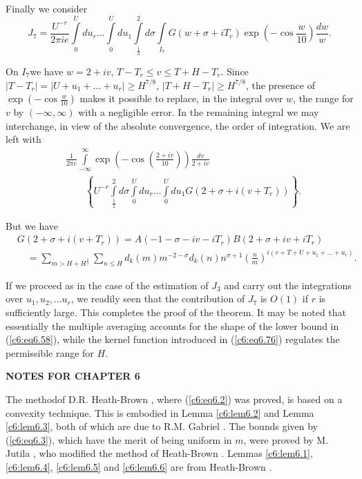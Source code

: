 Finally we consider
$$ 
J_7 = \frac{U^{-r}}{2 \pi i e} \int\limits^U_0 du_r \ldots
\int\limits^U_0 du_1 \int\limits^2_{\frac{1}{2}} d
\sigma\int\limits_{I_7} G(w+ \sigma + i T_r) \exp \left(-\cos
\frac{w}{10} \right) \frac{dw}{w}. 
$$

On $I_7$\pageoriginale we have $w = 2 + iv$, $T - T_r \leq v \leq T +
H - T_r$. Since $|T - T_r| = |U + u_1 + \ldots + u_r| \geq H^{7/8}$,
$|T+ H - T_r| \geq H^{7/8}$, the presence of $\exp\left(-\cos
\frac{w}{10} \right)$ makes it possible to replace, in the integral
over $w$, the range for $v$ by $(-\infty, \infty)$ with a negligible
error. In the remaining integral we may interchange, in view of the
absolute convergence, the order of integration. We are left with  
\begin{align*}
& \frac{1}{2\pi e} \int\limits^{\infty}_{-\infty} \exp \left(-\cos
  \left(\frac{2+iv}{10} \right) \right) \frac{dv}{2+iv}\\ 
& \qquad \left\{ U^{-r} \int\limits^2_{\frac{1}{2}} d \sigma
  \int\limits^U_0 du_r \ldots \int\limits^U_0 du_1 G \left(2+ \sigma +
  i (v+ T_r)\right)\right\}. 
\end{align*}

But we have
\begin{align*}
& G(2 + \sigma + i (v+ T_r)) = A(-1-\sigma - iv - iT_r) B (2+ \sigma +
  iv + iT_r)\\ 
&\quad = \sum\limits_{m> H + H^{\frac{1}{4}}} \sum\limits_{n \leq H}
  d_k(m) m^{-2 - \sigma} d_k(n) n^{\sigma +1} \left(\frac{n}{m}
  \right)^{i(v+T+ U+ u_1 + \ldots + u_r)}. 
\end{align*}

If we proceed as in the case of the estimation of $J_3$ and carry out
the integrations over $u_1,u_2, \ldots u_r$, we readily seen that the
contribution of $J_7$ is $O(1)$ if $r$ is sufficiently large. This
completes the proof of the theorem. It may be noted that essentially
the multiple averaging accounts for the shape of the lower bound in
(\ref{c6:eq6.58}), while the kernel function introduced in
(\ref{c6:eq6.76}) regulates the permissible range for $H$. 

\newpage

\begin{center}
\textbf{NOTES FOR CHAPTER 6}
\end{center}

The method\pageoriginale of D.R. Heath-Brown \cite{Heath-Brown4},
where (\ref{c6:eq6.2}) was proved, is based on a convexity
technique. This is embodied in Lemma \ref{c6:lem6.2} and Lemma
\ref{c6:lem6.3}, both of which are due to R.M. Gabriel
\cite{Gabriel1}. The bounds given by (\ref{c6:eq6.3}), which have the
merit of being uniform in $m$, were proved by M. Jutila
\cite{Jutila2}, who modified the method of Heath-Brown
\cite{Heath-Brown4}. Lemmas \ref{c6:lem6.1}, \ref{c6:lem6.4},
\ref{c6:lem6.5} and \ref{c6:lem6.6} are from Heath-Brown
\cite{Heath-Brown4}. 

